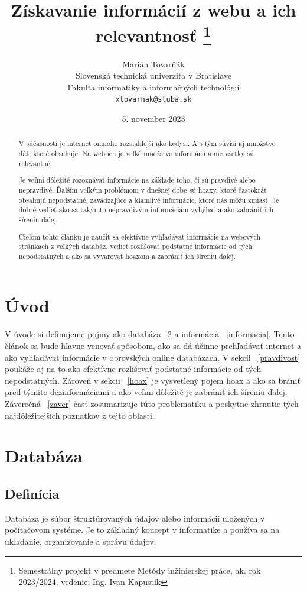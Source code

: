 \documentclass[10pt,twoside,slovak,a4paper]{article}
\title{Získavanie informácií z webu a ich relevantnosť 
\thanks{Semestrálny projekt v predmete Metódy inžinierskej práce, ak. rok 2023/2024, vedenie: Ing. Ivan Kapustík}}
\author{Marián Tovarňák\\[2pt]
	{\small Slovenská technická univerzita v Bratislave}\\
	{\small Fakulta informatiky a informačných technológií}\\
	{\small \texttt{xtovarnak@stuba.sk}}
	}
\date{\small 5. november 2023}
\begin{document}
\maketitle

\begin{abstract}
V súčasnosti je internet omnoho rozsiahlejší ako kedysi. A s tým súvisí aj množstvo dát, ktoré obsahuje. Na weboch je veľké množstvo informácií a nie všetky sú relevantné.

Je veľmi dôležité rozoznávať informácie na základe toho, či sú pravdivé alebo nepravdivé. Ďalším veľkým problémom v dnešnej dobe sú hoaxy, ktoré častokrát obsahujú nepodstatné, zavádzajúce a klamlivé informácie, ktoré nás môžu zmiasť. Je dobré vedieť ako sa takýmto nepravdivým informáciám vyhýbať a ako zabrániť ich šíreniu ďalej. 

Cieľom tohto článku je naučiť sa efektívne vyhľadávať informácie na webových stránkach z veľkých databáz, vedieť rozlišovať podstatné informácie od tých nepodstatných a ako sa vyvarovať hoaxom a zabrániť ich šíreniu ďalej.
\cite{ceri2013web} \cite{doi:10.1126/science.aap9559}

\end{abstract}



\section{Úvod} 
\label{uvod} 
V úvode si definujeme pojmy ako databáza ~\ref{databaza} a informácia ~\ref{informacia}. Tento článok sa bude hlavne venovať spôsobom, ako sa dá účinne prehľadávať internet a ako vyhľadávať informácie v obrovských online databázach. V sekcii ~\ref{pravdivost} poukáže aj na to ako efektívne rozlišovať podstatné informácie od tých nepodstatných. Zároveň v sekcii ~\ref{hoax} je vysvetlený pojem hoax a ako sa brániť pred týmito dezinformáciami a ako veľmi dôležité je zabrániť ich šíreniu ďalej. Záverečná ~\ref{zaver} časť zosumarizuje túto problematiku a poskytne zhrnutie tých najdôležitejších poznatkov z tejto oblasti.

\section{Databáza}
\label{databaza}
\subsection{Definícia}
Databáza je súbor štruktúrovaných údajov alebo informácií uložených v počítačovom systéme. Je to základný koncept v informatike a používa sa na ukladanie, organizovanie a správu údajov. 
\end{document}

